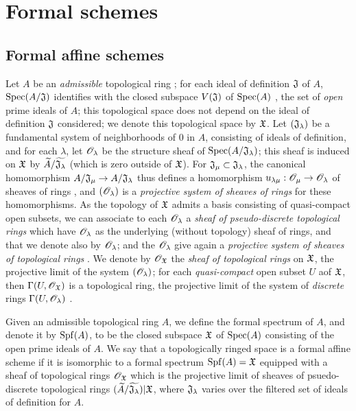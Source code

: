 \section{Formal schemes}
\label{section-formal-schemes}

\subsection{Formal affine schemes}
\label{subsection-formal-affine-schemes}

\begin{env}[10.1.1]
\label{1.10.1.1}
Let $A$ be an {\em admissible} topological ring ; for each
ideal of definition $\mathfrak{J}$ of $A$, ${\mathop{\mathrm{Spec}}\nolimits}(A/\mathfrak{J})$ identifies
with the closed subspace $V(\mathfrak{J})$ of ${\mathop{\mathrm{Spec}}\nolimits}(A)$ ,
the set of {\em open} prime ideals of $A$; this topological space does not depend
on the ideal of definition $\mathfrak{J}$ considered; we denote this topological
space by $\mathfrak{X}$. Let $(\mathfrak{J}_\lambda)$ be a fundamental system
of neighborhoods of $0$ in $A$, consisting of ideals of definition, and for each
$\lambda$, let $\mathscr{O}_\lambda$ be the structure sheaf of
${\mathop{\mathrm{Spec}}\nolimits}(A/\mathfrak{J}_\lambda)$; this sheaf is induced on $\mathfrak{X}$ by
$\widetilde{A}/\widetilde{\mathfrak{J}_\lambda}$ (which is zero outside of
$\mathfrak{X}$). For $\mathfrak{J}_\mu\subset\mathfrak{J}_\lambda$, the
canonical homomorphism $A/\mathfrak{J}_\mu\to A/\mathfrak{J}_\lambda$ thus
defines a homomorphism $u_{\lambda\mu}:\mathscr{O}_\mu\to\mathscr{O}_\lambda$ of sheaves of
rings , and $(\mathscr{O}_\lambda)$ is a {\em projective system of
sheaves of rings} for these homomorphisms. As the topology of $\mathfrak{X}$
admits a basis consisting of quasi-compact open subsets, we can associate to
each $\mathscr{O}_\lambda$ a {\em sheaf of pseudo-discrete topological rings}
 which have $\mathscr{O}_\lambda$ as the underlying (without topology)
sheaf of rings, and that we denote also by $\mathscr{O}_\lambda$; and the $\mathscr{O}_\lambda$ give again a
{\em projective system of sheaves of topological rings} .
We denote by $\mathscr{O}_\mathfrak{X}$ the {\em sheaf of topological rings} on $\mathfrak{X}$, the
projective limit of the system $(\mathscr{O}_\lambda)$; for each {\em quasi-compact} open subset $U$
aof $\mathfrak{X}$, then $\Gamma(U,\mathscr{O}_\mathfrak{X})$ is a topological ring, the projective
limit of the system of {\em discrete} rings $\Gamma(U,\mathscr{O}_\lambda)$
.
\end{env}

\begin{defn}[10.1.2]
\label{1.10.1.2}
Given an admissible topological ring $A$, we define the formal spectrum of $A$, and denote
it by ${\mathop{\mathrm{Spf}}\nolimits}(A)$, to be the closed subspace $\mathfrak{X}$ of ${\mathop{\mathrm{Spec}}\nolimits}(A)$ consisting of the
open prime ideals of $A$. We say that a topologically ringed space is a formal affine scheme
if it is isomorphic to a formal spectrum ${\mathop{\mathrm{Spf}}\nolimits}(A)=\mathfrak{X}$ equipped with a sheaf of
topological rings $\mathscr{O}_\mathfrak{X}$ which is the projective limit of sheaves of
psuedo-discrete topological rings
$(\widetilde{A}/\widetilde{\mathfrak{J}_\lambda})|\mathfrak{X}$, where $\mathfrak{J}_\lambda$
varies over the filtered set of ideals of definition for $A$.
\end{defn}

